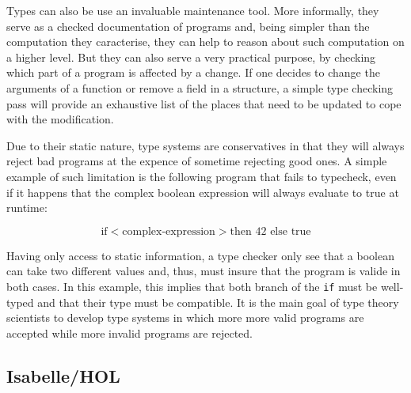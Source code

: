 Types can also be use an invaluable maintenance tool. More informally, they serve as a checked
documentation of programs and, being simpler than the computation they caracterise, they can help
to reason about such computation on a higher level. But they can also serve a very practical
purpose, by checking which part of a program is affected by a change. If one decides to change the
arguments of a function or remove a field in a structure, a simple type checking pass will provide
an exhaustive list of the places that need to be updated to cope with the modification.


Due to their static nature, type systems are conservatives in that they will always reject bad
programs at the expence of sometime rejecting good ones. A simple example of such limitation is the
following program that fails to typecheck, even if it happens that the complex boolean expression
will always evaluate to true at runtime:

\begin{displaymath}
  \text{if} <\text{complex-expression}> \text{then } 42 \text{ else } \text{true}
\end{displaymath}

Having only access to static information, a type checker only see that a boolean can take two
different values and, thus, must insure that the program is valide in both cases. In this example,
this implies that both branch of the \texttt{if} must be well-typed and that their type must be
compatible. It is the main goal of type theory scientists to develop type systems in which more more
valid programs are accepted while more invalid programs are rejected.

\subsection{Isabelle/HOL}


